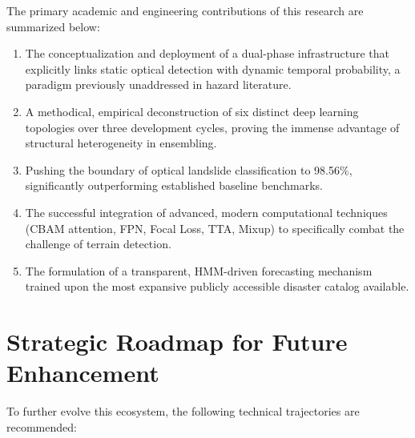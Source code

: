 \documentclass[12pt,a4paper]{report}
\begin{document}
The primary academic and engineering contributions of this research are summarized below:

\begin{enumerate}
    \item The conceptualization and deployment of a dual-phase infrastructure that explicitly links static optical detection with dynamic temporal probability, a paradigm previously unaddressed in hazard literature.
    \item A methodical, empirical deconstruction of six distinct deep learning topologies over three development cycles, proving the immense advantage of structural heterogeneity in ensembling.
    \item Pushing the boundary of optical landslide classification to 98.56\%, significantly outperforming established baseline benchmarks.
    \item The successful integration of advanced, modern computational techniques (CBAM attention, FPN, Focal Loss, TTA, Mixup) to specifically combat the challenge of terrain detection.
    \item The formulation of a transparent, HMM-driven forecasting mechanism trained upon the most expansive publicly accessible disaster catalog available.
\end{enumerate}

\section{Strategic Roadmap for Future Enhancement}
To further evolve this ecosystem, the following technical trajectories are recommended:
\end{document}
